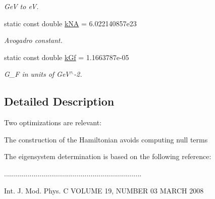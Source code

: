 \begin{DoxyCompactItemize}
\begin{DoxyCompactList}\small\item\em GeV to eV. \end{DoxyCompactList}\item 
static const double \hyperlink{classOscProb_1_1PMNS__Base_a69355e770b89e99437c2b8a66e48eeb9}{k\+NA} = 6.\+022140857e23
\begin{DoxyCompactList}\small\item\em Avogadro constant. \end{DoxyCompactList}\item 
static const double \hyperlink{classOscProb_1_1PMNS__Base_a7f26a3456128234b2ae6cc9141a6532f}{k\+Gf} = 1.\+1663787e-\/05
\begin{DoxyCompactList}\small\item\em G\+\_\+F in units of Ge\+V$^\wedge$-\/2. \end{DoxyCompactList}\end{DoxyCompactItemize}


\subsection{Detailed Description}
Two optimizations are relevant\+:~\newline

\begin{DoxyItemize}
\item The construction of the Hamiltonian avoids computing null terms~\newline

\item The eigensystem determination is based on the following reference\+:~\newline

\end{DoxyItemize}


\begin{DoxyPre}\end{DoxyPre}



\begin{DoxyPre}......................................................................\end{DoxyPre}



\begin{DoxyPre} Int. J. Mod. Phys. C       VOLUME 19, NUMBER 03            MARCH 2008\end{DoxyPre}



